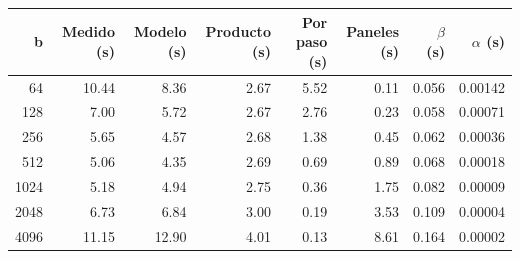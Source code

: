 \begin{tabular}{rrrrrrrr}
\toprule
b & Medido (s) & Modelo (s) & Producto (s) & Por paso (s) & Paneles (s) & $\beta$ (s) & $\alpha$ (s) \\
\midrule
64 & 10.44 & 8.36 & 2.67 & 5.52 & 0.11 & 0.056 & 0.00142 \\
128 & 7.00 & 5.72 & 2.67 & 2.76 & 0.23 & 0.058 & 0.00071 \\
256 & 5.65 & 4.57 & 2.68 & 1.38 & 0.45 & 0.062 & 0.00036 \\
512 & 5.06 & 4.35 & 2.69 & 0.69 & 0.89 & 0.068 & 0.00018 \\
1024 & 5.18 & 4.94 & 2.75 & 0.36 & 1.75 & 0.082 & 0.00009 \\
2048 & 6.73 & 6.84 & 3.00 & 0.19 & 3.53 & 0.109 & 0.00004 \\
4096 & 11.15 & 12.90 & 4.01 & 0.13 & 8.61 & 0.164 & 0.00002 \\
\bottomrule
\end{tabular}
